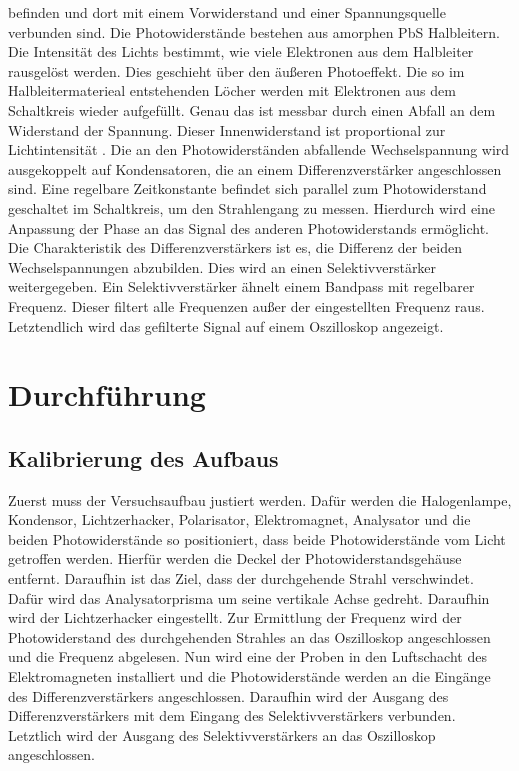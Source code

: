 \documentclass[
  bibliography=totoc,     %
  captions=tableheading,  %
  titlepage=firstiscover, %
]{scrartcl}
\begin{document}
befinden und dort mit einem Vorwiderstand und einer Spannungsquelle verbunden sind.
Die Photowiderstände bestehen aus amorphen PbS Halbleitern.
Die Intensität des Lichts bestimmt, wie viele Elektronen aus dem Halbleiter
rausgelöst werden. Dies geschieht über den äußeren Photoeffekt.
Die so im Halbleitermaterieal entstehenden Löcher werden mit Elektronen 
aus dem Schaltkreis wieder aufgefüllt. Genau das ist messbar durch einen Abfall
an dem Widerstand der Spannung. Dieser Innenwiderstand
ist proportional zur Lichtintensität \cite{anleitung}.
Die an den Photowiderständen abfallende Wechselspannung wird ausgekoppelt 
auf Kondensatoren, die an einem Differenzverstärker angeschlossen sind.
Eine regelbare Zeitkonstante befindet sich parallel zum Photowiderstand
geschaltet im Schaltkreis, um den Strahlengang zu messen.
Hierdurch wird eine Anpassung der Phase an das Signal des anderen 
Photowiderstands ermöglicht.
Die Charakteristik des Differenzverstärkers ist es, die Differenz der beiden
Wechselspannungen abzubilden. Dies wird an einen Selektivverstärker weitergegeben.
Ein Selektivverstärker ähnelt einem Bandpass mit regelbarer
Frequenz. Dieser filtert alle Frequenzen außer der eingestellten Frequenz raus.
Letztendlich wird das gefilterte Signal auf einem Oszilloskop angezeigt.

\section{Durchführung}
\label{sec:Durchführung}

\subsection{Kalibrierung des Aufbaus}
\label{sec:Kalibrierung}
Zuerst muss der Versuchsaufbau justiert werden. Dafür werden die Halogenlampe,
Kondensor, Lichtzerhacker, Polarisator, Elektromagnet, Analysator und die beiden
Photowiderstände so positioniert, dass beide Photowiderstände vom Licht getroffen
werden. Hierfür werden die Deckel der Photowiderstandsgehäuse entfernt. 
Daraufhin ist das Ziel, dass der durchgehende Strahl verschwindet. Dafür
wird das Analysatorprisma um seine vertikale Achse gedreht.
Daraufhin wird der Lichtzerhacker eingestellt. %
Zur Ermittlung der Frequenz wird der Photowiderstand des durchgehenden
Strahles an das Oszilloskop angeschlossen und die Frequenz abgelesen.
Nun wird eine der Proben in den Luftschacht des Elektromagneten installiert und
die Photowiderstände werden an die Eingänge des Differenzverstärkers angeschlossen.
Daraufhin wird der Ausgang des Differenzverstärkers mit dem Eingang des
Selektivverstärkers verbunden.
Letztlich wird der Ausgang des Selektivverstärkers an das Oszilloskop
angeschlossen.
\end{document}
